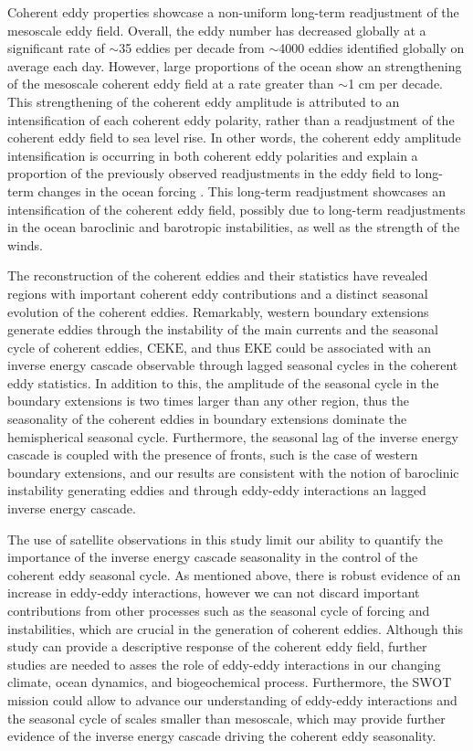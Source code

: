 \documentclass[draft,linenumbers]{agujournal2019}
\newcommand{\EKE}{\textrm{EKE}}
\newcommand{\CEKE}{\textrm{CEKE}}
\begin{document}
	Coherent eddy properties showcase a non-uniform long-term readjustment of the mesoscale eddy field. 
	Overall, the eddy number has decreased globally at a significant rate of $\sim$35 eddies per decade from $\sim$4000 eddies identified globally on average each day. 
	However, large proportions of the ocean show an strengthening of the mesoscale coherent eddy field at a rate greater than $\sim$1 cm per decade.
	This strengthening of the coherent eddy amplitude is attributed to an intensification of each coherent eddy polarity, rather than a readjustment of the coherent eddy field to sea level rise. 
	In other words, the coherent eddy amplitude intensification is occurring in both coherent eddy polarities and explain a proportion of the previously observed readjustments in the eddy field to long-term changes in the ocean forcing \citep{Hu_acceleration_2020,Wunsch_speeding_2020,Martinez_Kinetic_2021}. 
	This long-term readjustment showcases an intensification of the coherent eddy field, possibly due to long-term readjustments in the ocean baroclinic and barotropic instabilities, as well as the strength of the winds.
	
	The reconstruction of the coherent eddies and their statistics have revealed regions with important coherent eddy contributions and a distinct seasonal evolution of the coherent eddies. 
	Remarkably, western boundary extensions generate eddies through the instability of the main currents and the seasonal cycle of coherent eddies, $\CEKE$, and thus $\EKE$ could be associated with an inverse energy cascade observable through lagged seasonal cycles in the coherent eddy statistics. 
	In addition to this, the amplitude of the seasonal cycle in the boundary extensions is two times larger than any other region, thus the seasonality of the coherent eddies in boundary extensions dominate the hemispherical seasonal cycle. 
	Furthermore, the seasonal lag of the inverse energy cascade is coupled with the presence of fronts, such is the case of western boundary extensions, and our results are consistent with the notion of baroclinic instability generating eddies and through eddy-eddy interactions an lagged inverse energy cascade.
	
	The use of satellite observations in this study limit our ability to quantify the importance of the inverse energy cascade seasonality in the control of the coherent eddy seasonal cycle. 
	As mentioned above, there is robust evidence of an increase in eddy-eddy interactions, however we can not discard important contributions from other processes such as the seasonal cycle of forcing and instabilities, which are crucial in the generation of coherent eddies. Although this study can provide a descriptive response of the coherent eddy field, further studies are needed to asses the role of eddy-eddy interactions in our changing climate, ocean dynamics, and biogeochemical process. Furthermore, the SWOT mission could allow to advance our understanding of eddy-eddy interactions and the seasonal cycle of scales smaller than mesoscale, which may provide further evidence of the inverse energy cascade driving the coherent eddy seasonality.
\end{document}
